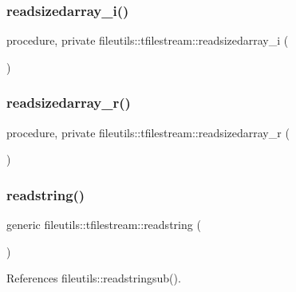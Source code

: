 \subsubsection{\texorpdfstring{readsizedarray\+\_\+i()}{readsizedarray\_i()}}
{\footnotesize\ttfamily procedure, private fileutils\+::tfilestream\+::readsizedarray\+\_\+i (\begin{DoxyParamCaption}{ }\end{DoxyParamCaption})\hspace{0.3cm}{\ttfamily [private]}}

\mbox{\label{structfileutils_1_1tfilestream_a613ca3ff702a8d474c38548b35fcf7d5}} 
\subsubsection{\texorpdfstring{readsizedarray\+\_\+r()}{readsizedarray\_r()}}
{\footnotesize\ttfamily procedure, private fileutils\+::tfilestream\+::readsizedarray\+\_\+r (\begin{DoxyParamCaption}{ }\end{DoxyParamCaption})\hspace{0.3cm}{\ttfamily [private]}}

\mbox{\label{structfileutils_1_1tfilestream_a93683194f64760a507d8b22afb0d311b}} 
\subsubsection{\texorpdfstring{readstring()}{readstring()}}
{\footnotesize\ttfamily generic fileutils\+::tfilestream\+::readstring (\begin{DoxyParamCaption}{ }\end{DoxyParamCaption})\hspace{0.3cm}{\ttfamily [private]}}



References fileutils\+::readstringsub().

